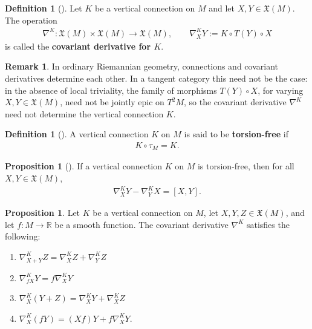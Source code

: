 \documentclass{amsart}
\newcommand{\R}{\mathbb{R}}
\theoremstyle{definition}
\newtheorem{defn}[thm]{Definition}
\newtheorem{rem}[thm]{Remark}
\newtheorem{prop}[thm]{Proposition}
\begin{document}
\begin{defn}[{\cite[Definition~3.15]{CC17}}]\label{def:covariant-derivative}
  Let $K$ be a vertical connection on $M$ and let $X, Y \in \mathfrak{X}(M)$.
  The operation
  \begin{align*}
    \nabla^K \colon \mathfrak{X}(M) \times \mathfrak{X}(M) \to \mathfrak{X}(M),\qquad
    \nabla^K_X Y := K \circ T(Y) \circ X
  \end{align*}
  is called the \textbf{covariant derivative for $K$}.
\end{defn}

\begin{rem}\label{rem:cov-deriv-vs-connection}
  In ordinary Riemannian geometry, connections and covariant derivatives
  determine each other. In a tangent category this need not be the case:
  in the absence of local triviality, the family of morphisms
  $T(Y) \circ X$, for varying $X, Y \in \mathfrak{X}(M)$, need not be
  jointly epic on $T^2M$, so the covariant derivative $\nabla^K$ need not
  determine the vertical connection $K$.
\end{rem}

\begin{defn}[{\cite[Definition~3.24]{CC17}}]\label{def:torsion-free}
  A vertical connection $K$ on $M$ is said to be \textbf{torsion-free} if
  \begin{align*}
    K \circ \tau_M = K.
  \end{align*}
\end{defn}

\begin{prop}[{\cite[Corollary~3.32]{CC17}}]\label{prop:torsion-free-bracket}
  If a vertical connection $K$ on $M$ is torsion-free, then for all
  $X, Y \in \mathfrak{X}(M)$,
  \begin{align*}
    \nabla^K_X Y - \nabla^K_Y X = [X, Y].
  \end{align*}
\end{prop}

\begin{prop}\label{prop:covariant-derivative-properties}
  Let $K$ be a vertical connection on $M$,
  let $X, Y, Z \in \mathfrak{X}(M)$, and let $f \colon M \to \R$ be a smooth
  function. The covariant derivative $\nabla^K$ satisfies the following:
  \begin{enumerate}
    \item $\nabla^K_{X+Y}Z = \nabla^K_X Z + \nabla^K_Y Z$
    \item $\nabla^K_{fX}Y = f\nabla^K_X Y$
    \item $\nabla^K_X (Y + Z) = \nabla^K_X Y + \nabla^K_X Z$
    \item $\nabla^K_X (fY) = (Xf)Y + f\nabla^K_X Y$.
  \end{enumerate}
\end{prop}
\end{document}
